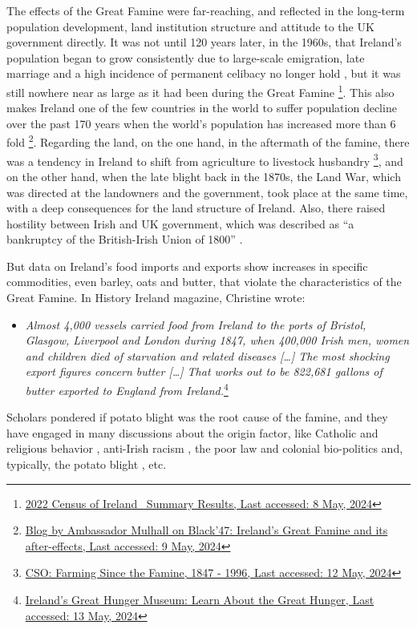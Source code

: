 The effects of the Great Famine were far-reaching, and reflected in the long-term population development, land institution structure and attitude to the UK government directly. It was not until 120 years later, in the 1960s, that Ireland's population began to grow consistently due to large-scale emigration, late marriage and a high incidence of permanent celibacy no longer hold \citep{grada1979population}, but it was still nowhere near as large as it had been during the Great Famine
\footnote{
	\href{https://www.cso.ie/en/releasesandpublications/ep/p-cpsr/censusofpopulation2022-summaryresults/populationchanges/}
	{2022 Census of Ireland \textendash\ Summary Results, Last accessed: 8 May, 2024}
}.
This also makes Ireland one of the few countries in the world to suffer population decline over the past 170 years when the world's population has increased more than 6 fold
\footnote{
	\href{https://www.dfa.ie/irish-embassy/usa/about-us/ambassador/ambassadors-blog/black47irelandsgreatfamineanditsafter-effects/}
	{Blog by Ambassador Mulhall on Black'47: Ireland's Great Famine and its after-effects, Last accessed: 9 May, 2024}
}. Regarding the land, on the one hand, in the aftermath of the famine, there was a tendency in Ireland to shift from agriculture to livestock husbandry
\footnote{
	\href{https://www.cso.ie/en/statistics/othercsopublications/farmingsincethefamine1847-1996/}{CSO: Farming Since the Famine, 1847 - 1996, Last accessed: 12 May, 2024}
}, and on the other hand, when the late blight back in the 1870s, the Land War, which was directed at the landowners and the government, took place at the same time, with a deep consequences for the land structure of Ireland. Also, there raised hostility between Irish and UK government, which was described as ``a bankruptcy of the British-Irish Union of 1800'' \citep{gray2021great}.

But data on Ireland's food imports and exports show increases in specific commodities, even barley, oats and butter, that violate the characteristics of the Great Famine. In History Ireland magazine, Christine wrote:
\begin{itemize}
	\item[] \textit{Almost 4,000 vessels carried food from Ireland to the ports of Bristol, Glasgow, Liverpool and London during 1847, when 400,000 Irish men, women and children died of starvation and related diseases [\ldots] The most shocking export figures concern butter [\ldots] That works out to be 822,681 gallons of butter exported to England from Ireland.}\footnote{
	\href{https://www.ighm.org/learn.html}{Ireland's Great Hunger Museum: Learn About the Great Hunger, Last accessed: 13 May, 2024}}
\end{itemize}
Scholars pondered if potato blight was the root cause of the famine, and they have engaged in many discussions about the origin factor, like Catholic and religious behavior \citep{miller1975irish}, anti-Irish racism \citep{waters1995great}, the poor law and colonial bio-politics \citep{nally2008coming} and, typically, the potato blight \citep{bartoletti2001black}, etc.

